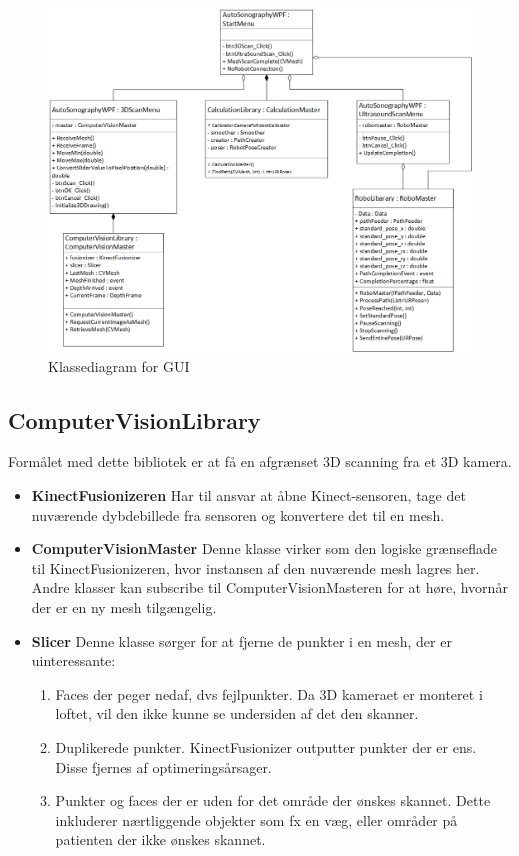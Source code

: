 \begin{figure}[H]
    \centering
    \includegraphics[width=1\textwidth]{figurer/d/Design/Class/uml_class_gui}
    \caption{Klassediagram for GUI}
    \label{class_gui}
\end{figure}
\newpage

\subsection{ComputerVisionLibrary} \label{ComputerVisionLibrary}
Formålet med dette bibliotek er at få en afgrænset 3D scanning fra et 3D kamera.

\begin{itemize}
\item{\textbf{KinectFusionizeren}}\newline
Har til ansvar at åbne Kinect-sensoren, tage det nuværende dybdebillede fra sensoren og konvertere det til en mesh.

\item{\textbf{ComputerVisionMaster}}\newline
Denne klasse virker som den logiske grænseflade til KinectFusionizeren, hvor instansen af den nuværende mesh lagres her.
Andre klasser kan subscribe til ComputerVisionMasteren for at høre, hvornår der er en ny mesh tilgængelig.

\item{\textbf{Slicer}}\newline
Denne klasse sørger for at fjerne de punkter i en mesh, der er uinteressante:
\begin{enumerate}
\item{Faces der peger nedaf, dvs fejlpunkter. Da 3D kameraet er monteret i loftet, vil den ikke kunne se undersiden af det den skanner.}
\item{Duplikerede punkter. KinectFusionizer outputter punkter der er ens. Disse fjernes af optimeringsårsager.}
\item{Punkter og faces der er uden for det område der ønskes skannet. Dette inkluderer nærtliggende objekter som fx en væg, eller områder på patienten der ikke ønskes skannet.}
\end{enumerate}
\end{itemize}

